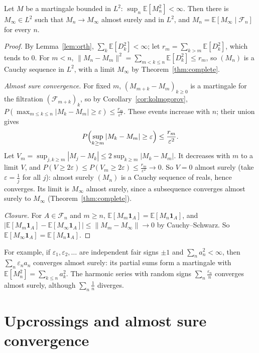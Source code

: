 \begin{theorem}[convergence in $L^2$]\label{thm:L2conv}
Let $M$ be a martingale bounded in $L^2$: $\sup_n\mathbb E[M_n^2]<\infty$. Then there is $M_\infty\in L^2$ such that $M_n\to M_\infty$ almost surely and in $L^2$, and
$M_n=\mathbb E[M_\infty\mid\mathcal F_n]$ for every $n$.
\end{theorem}
\begin{proof}
By Lemma~\ref{lem:orth}, $\sum_k\mathbb E[D_k^2]<\infty$; let $r_m=\sum_{k>m}\mathbb E[D_k^2]$, which tends to $0$. For $m<n$, $\|M_n-M_m\|^2=\sum_{m<k\le n}\mathbb E[D_k^2]\le r_m$, so $(M_n)$ is a
Cauchy sequence in $L^2$, with a limit $M_\infty$ by Theorem~\ref{thm:complete}.

\emph{Almost sure convergence.} For fixed $m$, $(M_{m+k}-M_m)_{k\ge0}$ is a martingale for the filtration $(\mathcal F_{m+k})_k$, so by Corollary~\ref{cor:kolmogorov},
$P(\max_{m\le k\le n}|M_k-M_m|\ge\varepsilon)\le\frac{r_m}{\varepsilon^2}$. These events increase with $n$; their union gives
\[
P\Bigl(\sup_{k\ge m}|M_k-M_m|\ge\varepsilon\Bigr)\le\frac{r_m}{\varepsilon^2}.
\]
Let $V_m=\sup_{j,k\ge m}|M_j-M_k|\le2\sup_{k\ge m}|M_k-M_m|$. It decreases with $m$ to a limit $V$, and $P(V\ge2\varepsilon)\le P(V_m\ge2\varepsilon)\le\frac{r_m}{\varepsilon^2}\to0$.
So $V=0$ almost surely (take $\varepsilon=\frac1j$ for all $j$): almost surely $(M_n)$ is a Cauchy sequence of reals, hence converges. Its limit is
$M_\infty$ almost surely, since a subsequence converges almost surely to $M_\infty$ (Theorem~\ref{thm:complete}).

\emph{Closure.} For $A\in\mathcal F_n$ and $m\ge n$, $\mathbb E[M_m\mathbf 1_A]=\mathbb E[M_n\mathbf 1_A]$, and $|\mathbb E[M_m\mathbf 1_A]-\mathbb E[M_\infty\mathbf 1_A]|\le\|M_m-M_\infty\|\to0$ by Cauchy--Schwarz.
So $\mathbb E[M_\infty\mathbf 1_A]=\mathbb E[M_n\mathbf 1_A]$.
\end{proof}

For example, if $\varepsilon_1,\varepsilon_2,\ldots$ are independent fair signs $\pm1$ and $\sum_na_n^2<\infty$, then $\sum_n\varepsilon_na_n$ converges almost surely: its partial
sums form a martingale with $\mathbb E[M_n^2]=\sum_{k\le n}a_k^2$. The harmonic series with random signs $\sum_n\frac{\varepsilon_n}n$ converges almost surely, although
$\sum_n\frac1n$ diverges.

\section{Upcrossings and almost sure convergence}

